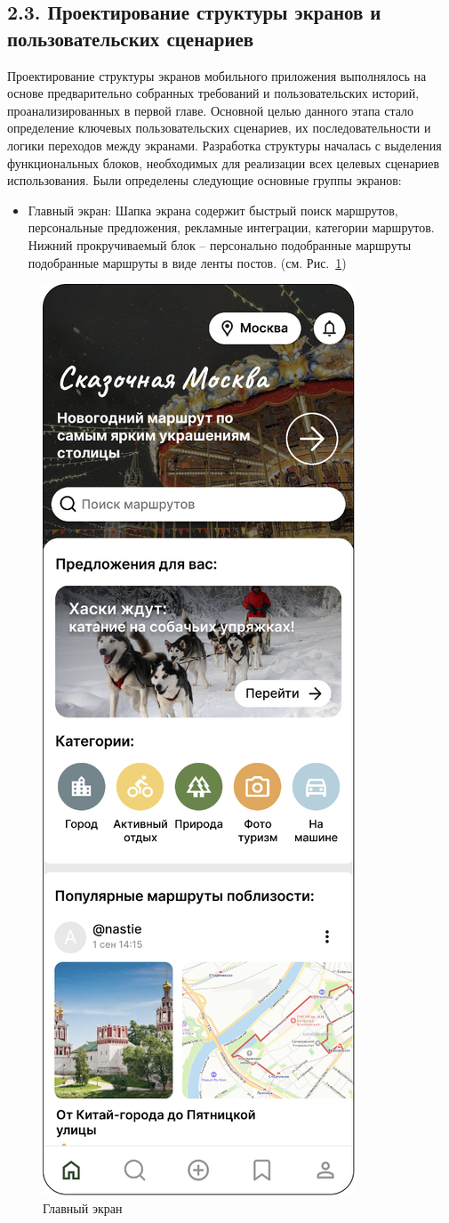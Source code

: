 \subsection*{2.3. Проектирование структуры экранов и пользовательских сценариев} 
Проектирование структуры экранов мобильного приложения выполнялось на основе предварительно собранных требований и пользовательских историй, проанализированных в первой главе. Основной целью данного этапа стало определение ключевых пользовательских сценариев, их последовательности и логики переходов между экранами.
Разработка структуры началась с выделения функциональных блоков, необходимых для реализации всех целевых сценариев использования. Были определены следующие основные группы экранов:
\begin{itemize}
    \item Главный экран: Шапка экрана содержит быстрый поиск маршрутов, персональные предложения, рекламные интеграции, категории маршрутов. Нижний прокручиваемый блок – персонально подобранные маршруты подобранные маршруты в виде ленты постов. (см. Рис.~\ref{fig:main_screen_ui_1})
\end{itemize}
\begin{figure}[H]
        \centering
        \includegraphics[width=0.4\linewidth]{Images/ui/Picture1.png}
        \caption{Главный экран}
        \label{fig:main_screen_ui_1}
\end{figure}

